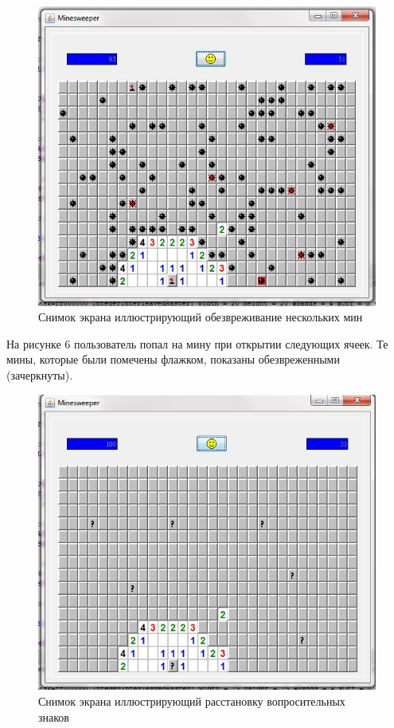 \begin{figure}[H]
	\begin{center}
		\includegraphics[scale=0.7]{images/4.jpg}
		\caption{Снимок экрана иллюстрирующий обезвреживание нескольких мин} 
		\label{pic:pic_name} %
	\end{center}
\end{figure}

На рисунке 6 пользователь попал на мину при открытии следующих ячеек. Те мины, которые были помечены флажком, показаны обезвреженными (зачеркнуты).

\begin{figure}[H]
	\begin{center}
		\includegraphics[scale=0.7]{images/5.jpg}
		\caption{Снимок экрана иллюстрирующий расстановку вопросительных знаков} 
		\label{pic:pic_name} %
	\end{center}
\end{figure}

